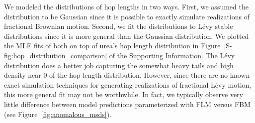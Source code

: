 \documentclass[journal=jctcce,manuscript=article]{achemso}
\begin{document}
  
  We modeled the distributions of hop lengths in two ways. First, we assumed
  the distribution to be Gaussian since it is possible to exactly simulate
  realizations of fractional Brownian motion. Second, we fit the distributions
  to L\'evy stable distributions since it is more general than the Gaussian
  distribution. We plotted the MLE fits of both on top of urea's hop length
  distribution in Figure~\ref{S-fig:hop_distribution_comparison} of the
  Supporting Information. The L\'evy distribution does a better job capturing
  the somewhat heavy tails and high density near 0 of the hop length distribution. 
  However, since there are no known exact simulation techniques for generating 
  realizations of fractional L\'evy motion, this more general fit may not be 
  worthwhile. In fact, we typically observe very little difference between model
  predictions parameterized with FLM versus FBM (see Figure~\ref{fig:anomalous_msds}).
\end{document}

